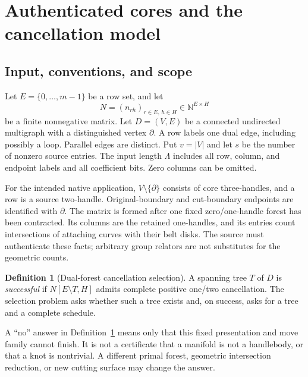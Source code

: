 \documentclass[11pt,letterpaper]{article}
\theoremstyle{definition}
\newtheorem{definition}[theorem]{Definition}
\theoremstyle{remark}
\newcommand{\N}{\mathbb N}
\begin{document}
\section{Authenticated cores and the cancellation model}\label{sec:model}
\subsection{Input, conventions, and scope}
Let $E=\{0,\ldots,m-1\}$ be a row set, and let
\[
 N=(n_{rh})_{r\in E,\,h\in H}\in\N^{E\times H}
\]
be a finite nonnegative matrix. Let $D=(V,E)$ be a connected undirected multigraph
with a distinguished vertex $\partial$. A row labels one dual edge, including
possibly a loop. Parallel edges are distinct. Put $v=|V|$ and let $s$ be the number
of nonzero source entries. The input length $\Lambda$ includes all row, column,
and endpoint labels and all coefficient bits. Zero columns can be omitted.

For the intended native application, $V\setminus\{\partial\}$ consists of core
three-handles, and a row is a source two-handle. Original-boundary and cut-boundary
endpoints are identified with $\partial$. The matrix is formed after one fixed
zero/one-handle forest has been contracted. Its columns are the retained
one-handles, and its entries count intersections of attaching curves with their
belt disks. The source must authenticate these facts; arbitrary group relators
are not substitutes for the geometric counts.

\begin{definition}[Dual-forest cancellation selection]\label{def:problem}
A spanning tree $T$ of $D$ is \emph{successful} if $N[E\setminus T,H]$ admits
complete positive one/two cancellation. The selection problem asks whether such
a tree exists and, on success, asks for a tree and a complete schedule.
\end{definition}

A ``no'' answer in Definition~\ref{def:problem} means only that this fixed
presentation and move family cannot finish. It is not a certificate that a
manifold is not a handlebody, or that a knot is nontrivial. A different primal
forest, geometric intersection reduction, or new cutting surface may change the
answer.
\end{document}
